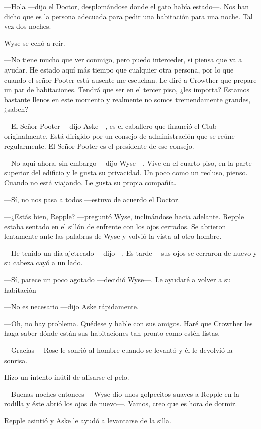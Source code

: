 {---Hola ---dijo el Doctor, desplomándose donde el gato había estado---.
	Nos han dicho que es la persona adecuada para pedir una habitación para
una noche. Tal vez dos noches.}

{Wyse se echó a reír.}

{---No tiene mucho que ver conmigo, pero puedo interceder, si piensa que
	va a ayudar. He estado aquí más tiempo que cualquier otra persona, por
	lo que cuando el señor Pooter está ausente me escuchan. Le diré a
	Crowther que prepare un par de habitaciones. Tendrá que ser en el tercer
	piso, ¿les importa? Estamos bastante llenos en este momento y realmente
no somos tremendamente grandes, ¿saben?}

{---El Señor Pooter ---dijo Aske---, es el caballero que financió el
	Club originalmente. Está dirigido por un consejo de administración que
se reúne regularmente. El Señor Pooter es el presidente de ese consejo.}

{---No aquí ahora, sin embargo ---dijo Wyse---. Vive en el cuarto piso,
	en la parte superior del edificio y le gusta su privacidad. Un poco como
	un recluso, pienso. Cuando no está viajando. Le gusta su propia
compañía.}

{---Sí, no nos pasa a todos ---estuvo de acuerdo el Doctor.}

{---¿Estás bien, Repple? ---preguntó Wyse, inclinándose hacia adelante.
	Repple estaba sentado en el sillón de enfrente con los ojos cerrados. Se
	abrieron lentamente ante las palabras de Wyse y volvió la vista al otro
hombre.}

{---He tenido un día ajetreado ---dijo---. Es tarde ---sus ojos se
cerraron de nuevo y su cabeza cayó a un lado.}

{---Sí, parece un poco agotado ---decidió Wyse---. Le ayudaré a volver a
su habitación}

{---No es necesario ---dijo Aske rápidamente.}

{---Oh, no hay problema. Quédese y hable con sus amigos. Haré que
	Crowther les haga saber dónde están sus habitaciones tan pronto como
estén listas.}

{---Gracias ---Rose le sonrió al hombre cuando se levantó y él le
devolvió la sonrisa.}

{Hizo un intento inútil de alisarse el pelo.}

{---Buenas noches entonces ---Wyse dio unos golpecitos suaves a Repple
	en la rodilla y éste abrió los ojos de nuevo---. Vamos, creo que es hora
de dormir.}

{Repple asintió y Aske le ayudó a levantarse de la silla.}

